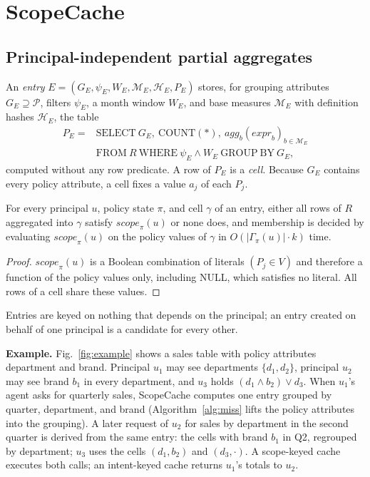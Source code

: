 \documentclass[sigconf, nonacm]{acmart}
\newcommand{\scope}{\mathit{scope}}
\begin{document}
\section{ScopeCache}
\label{sec:method}

\subsection{Principal-independent partial aggregates}

An \emph{entry} $E=(G_E,\psi_E,W_E,\mathcal{M}_E,\mathcal{H}_E,P_E)$ stores, for grouping attributes $G_E\supseteq\mathcal{P}$, filters $\psi_E$, a month window $W_E$, and base measures $\mathcal{M}_E$ with definition hashes $\mathcal{H}_E$, the table
\[
\begin{aligned}
P_E={}&\mathrm{SELECT}\ G_E,\ \mathrm{COUNT}(*),\ \mathit{agg}_b(\mathit{expr}_b)_{b\in\mathcal{M}_E}\\
&\mathrm{FROM}\ R\ \mathrm{WHERE}\ \psi_E\wedge W_E\ \mathrm{GROUP\ BY}\ G_E,
\end{aligned}
\]
computed without any row predicate. A row of $P_E$ is a \emph{cell}. Because $G_E$ contains every policy attribute, a cell fixes a value $a_j$ of each $P_j$.

\begin{lemma}
\label{lem:pure}
For every principal $u$, policy state $\pi$, and cell $\gamma$ of an entry, either all rows of $R$ aggregated into $\gamma$ satisfy $\scope_\pi(u)$ or none does, and membership is decided by evaluating $\scope_\pi(u)$ on the policy values of $\gamma$ in $O(|\Gamma_\pi(u)|\cdot k)$ time.
\end{lemma}
\begin{proof}
$\scope_\pi(u)$ is a Boolean combination of literals $(P_j\in V)$ and therefore a function of the policy values only, including NULL, which satisfies no literal. All rows of a cell share these values.
\end{proof}

Entries are keyed on nothing that depends on the principal; an entry created on behalf of one principal is a candidate for every other.

\textbf{Example.} Fig.~\ref{fig:example} shows a sales table with policy attributes department and brand. Principal $u_1$ may see departments $\{d_1,d_2\}$, principal $u_2$ may see brand $b_1$ in every department, and $u_3$ holds $(d_1\wedge b_2)\vee d_3$. When $u_1$'s agent asks for quarterly sales, ScopeCache computes one entry grouped by quarter, department, and brand (Algorithm~\ref{alg:miss} lifts the policy attributes into the grouping). A later request of $u_2$ for sales by department in the second quarter is derived from the same entry: the cells with brand $b_1$ in Q2, regrouped by department; $u_3$ uses the cells $(d_1,b_2)$ and $(d_3,\cdot)$. A scope-keyed cache executes both calls; an intent-keyed cache returns $u_1$'s totals to $u_2$.
\end{document}

